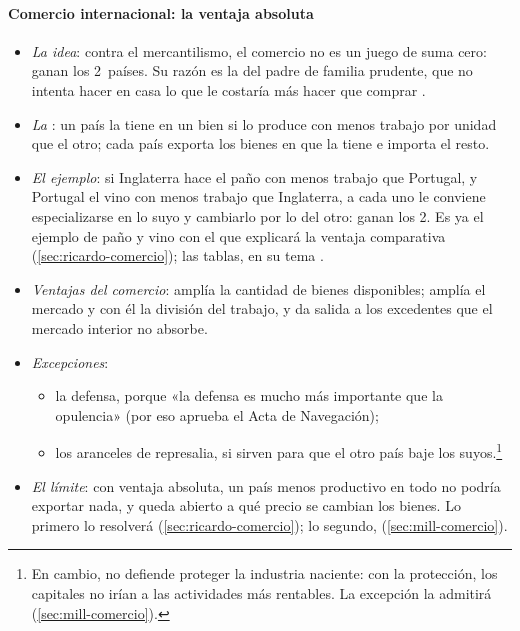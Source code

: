 \documentclass[11pt]{article}
\begin{document}
\paragraph{Comercio internacional: la ventaja absoluta}\label{sec:smith-comercio}
\begin{itemize}
\item \emph{La idea}: contra el mercantilismo, el comercio no es un juego de suma cero: ganan los 2~países. Su razón es la del padre de familia prudente, que no intenta hacer en casa lo que le costaría más hacer que comprar\nocite{Smith1776Wealth} .
\item \emph{La }: un país la tiene en un bien si lo produce con menos trabajo por unidad que el otro; cada país exporta los bienes en que la tiene e importa el resto.
\item \emph{El ejemplo}: si Inglaterra hace el paño con menos trabajo que Portugal, y Portugal el vino con menos trabajo que Inglaterra, a cada uno le conviene especializarse en lo suyo y cambiarlo por lo del otro: ganan los 2. Es ya el ejemplo de paño y vino con el que  explicará la ventaja comparativa (\ref{sec:ricardo-comercio}); las tablas, en su tema .
\item \emph{Ventajas del comercio}: amplía la cantidad de bienes disponibles; amplía el mercado y con él la división del trabajo, y da salida a los excedentes que el mercado interior no absorbe.
\item \emph{Excepciones}:
  \begin{itemize}
  \item la defensa, porque «la defensa es mucho más importante que la opulencia» (por eso aprueba el Acta de Navegación)\nocite{Smith1776Wealth};
  \item los aranceles de represalia, si sirven para que el otro país baje los suyos.\footnote{En cambio,  no defiende proteger la industria naciente: con la protección, los capitales no irían a las actividades más rentables. La excepción la admitirá  (\ref{sec:mill-comercio}).}
  \end{itemize}
\item \emph{El límite}: con ventaja absoluta, un país menos productivo en todo no podría exportar nada, y queda abierto a qué precio se cambian los bienes. Lo primero lo resolverá  (\ref{sec:ricardo-comercio}); lo segundo,  (\ref{sec:mill-comercio}).
\end{itemize}
\end{document}
